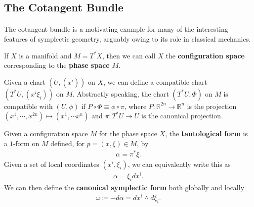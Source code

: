 \documentclass[11pt, final]{article}
\begin{document}
\subsection{The Cotangent Bundle}

\paragraph{} The cotangent bundle is a motivating example for many of the interesting features of symplectic geometry, arguably owing to its role in classical mechanics.

\begin{definition}
	If $X$ is a manifold and $M = T^*X$, then we can call $X$ the \textbf{configuration space} corresponding to the \textbf{phase space} $M$.
\end{definition}
\begin{remark}
	Given a chart $\left(U,(x^i)\right)$ on $X$, we can define a compatible chart $\left( T^*U,(x^i \xi_i ) \right)$ on $M$. Abstractly speaking, the chart $(T^*U, \Phi)$ on $M$ is compatible with $(U,\phi)$ if ${P \circ \Phi \equiv \phi \circ \pi}$, where $P : \mathbb{R}^{2n} \to \mathbb{R}^n$ is the projection $(x^1,\cdots, x^{2n}) \mapsto (x^1, \cdots x^n)$ and $\pi: T^*U \to U$ is the canonical projection. 
\end{remark}

\begin{definition}
	Given a configuration space $M$ for the phase space $X$, the \textbf{tautological form} is a $1$-form on $M$ defined, for $p = (x,\xi) \in M$, by
		\begin{align}\label{eq:tautForm}
			\alpha = \pi^* \xi.
		\end{align}
	Given a set of local coordinates $(x^i , \xi_i)$, we can equivalently write this as 
		\begin{align}
			\alpha = \xi_i dx^i.
		\end{align}
	We can then define the \textbf{canonical symplectic form} both globally and locally
		\begin{align}
			\omega \coloneqq - d\alpha = dx^i \wedge d\xi_i.
		\end{align}
\end{definition}
\end{document}
